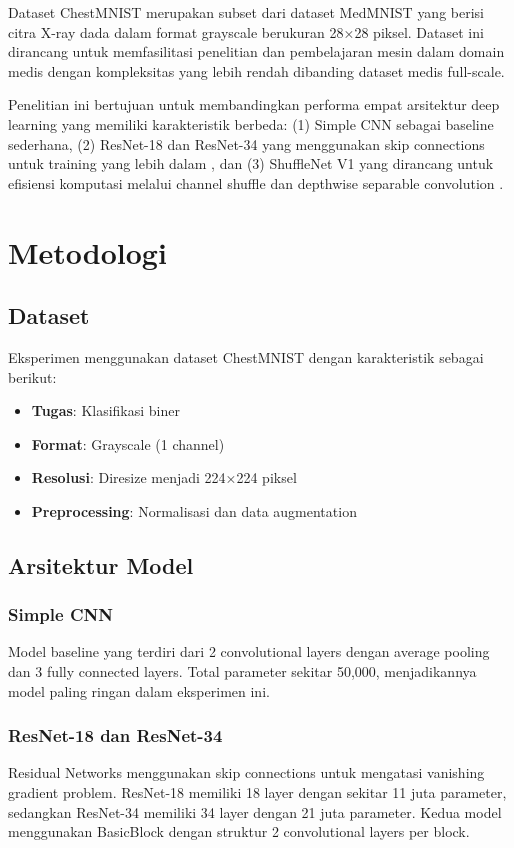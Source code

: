 \documentclass[conference]{IEEEtran}
\begin{document}
Dataset ChestMNIST merupakan subset dari dataset MedMNIST \cite{yang2021medmnist} yang berisi citra X-ray dada dalam format grayscale berukuran 28×28 piksel. Dataset ini dirancang untuk memfasilitasi penelitian dan pembelajaran mesin dalam domain medis dengan kompleksitas yang lebih rendah dibanding dataset medis full-scale.

Penelitian ini bertujuan untuk membandingkan performa empat arsitektur deep learning yang memiliki karakteristik berbeda: (1) Simple CNN sebagai baseline sederhana, (2) ResNet-18 dan ResNet-34 yang menggunakan skip connections untuk training yang lebih dalam \cite{he2016deep}, dan (3) ShuffleNet V1 yang dirancang untuk efisiensi komputasi melalui channel shuffle dan depthwise separable convolution \cite{zhang2018shufflenet}.

\section{Metodologi}

\subsection{Dataset}
Eksperimen menggunakan dataset ChestMNIST dengan karakteristik sebagai berikut:
\begin{itemize}
    \item \textbf{Tugas}: Klasifikasi biner
    \item \textbf{Format}: Grayscale (1 channel)
    \item \textbf{Resolusi}: Diresize menjadi 224×224 piksel
    \item \textbf{Preprocessing}: Normalisasi dan data augmentation
\end{itemize}

\subsection{Arsitektur Model}

\subsubsection{Simple CNN}
Model baseline yang terdiri dari 2 convolutional layers dengan average pooling dan 3 fully connected layers. Total parameter sekitar 50,000, menjadikannya model paling ringan dalam eksperimen ini.

\subsubsection{ResNet-18 dan ResNet-34}
Residual Networks menggunakan skip connections untuk mengatasi vanishing gradient problem. ResNet-18 memiliki 18 layer dengan sekitar 11 juta parameter, sedangkan ResNet-34 memiliki 34 layer dengan 21 juta parameter. Kedua model menggunakan BasicBlock dengan struktur 2 convolutional layers per block.
\end{document}
